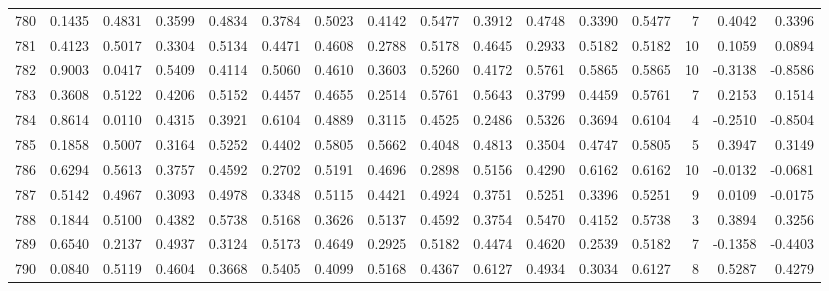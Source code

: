 \begin{tabular}{lrrrrrrrrrrrrrrr}
780 &      0.1435 &  0.4831 &  0.3599 &  0.4834 &  0.3784 &  0.5023 &  0.4142 &  0.5477 &  0.3912 &  0.4748 &   0.3390 &     0.5477 &      7 &                    0.4042 &                     0.3396 \\
781 &      0.4123 &  0.5017 &  0.3304 &  0.5134 &  0.4471 &  0.4608 &  0.2788 &  0.5178 &  0.4645 &  0.2933 &   0.5182 &     0.5182 &     10 &                    0.1059 &                     0.0894 \\
782 &      0.9003 &  0.0417 &  0.5409 &  0.4114 &  0.5060 &  0.4610 &  0.3603 &  0.5260 &  0.4172 &  0.5761 &   0.5865 &     0.5865 &     10 &                   -0.3138 &                    -0.8586 \\
783 &      0.3608 &  0.5122 &  0.4206 &  0.5152 &  0.4457 &  0.4655 &  0.2514 &  0.5761 &  0.5643 &  0.3799 &   0.4459 &     0.5761 &      7 &                    0.2153 &                     0.1514 \\
784 &      0.8614 &  0.0110 &  0.4315 &  0.3921 &  0.6104 &  0.4889 &  0.3115 &  0.4525 &  0.2486 &  0.5326 &   0.3694 &     0.6104 &      4 &                   -0.2510 &                    -0.8504 \\
785 &      0.1858 &  0.5007 &  0.3164 &  0.5252 &  0.4402 &  0.5805 &  0.5662 &  0.4048 &  0.4813 &  0.3504 &   0.4747 &     0.5805 &      5 &                    0.3947 &                     0.3149 \\
786 &      0.6294 &  0.5613 &  0.3757 &  0.4592 &  0.2702 &  0.5191 &  0.4696 &  0.2898 &  0.5156 &  0.4290 &   0.6162 &     0.6162 &     10 &                   -0.0132 &                    -0.0681 \\
787 &      0.5142 &  0.4967 &  0.3093 &  0.4978 &  0.3348 &  0.5115 &  0.4421 &  0.4924 &  0.3751 &  0.5251 &   0.3396 &     0.5251 &      9 &                    0.0109 &                    -0.0175 \\
788 &      0.1844 &  0.5100 &  0.4382 &  0.5738 &  0.5168 &  0.3626 &  0.5137 &  0.4592 &  0.3754 &  0.5470 &   0.4152 &     0.5738 &      3 &                    0.3894 &                     0.3256 \\
789 &      0.6540 &  0.2137 &  0.4937 &  0.3124 &  0.5173 &  0.4649 &  0.2925 &  0.5182 &  0.4474 &  0.4620 &   0.2539 &     0.5182 &      7 &                   -0.1358 &                    -0.4403 \\
790 &      0.0840 &  0.5119 &  0.4604 &  0.3668 &  0.5405 &  0.4099 &  0.5168 &  0.4367 &  0.6127 &  0.4934 &   0.3034 &     0.6127 &      8 &                    0.5287 &                     0.4279 \\

\end{tabular}
